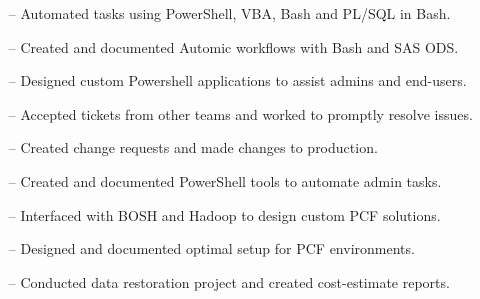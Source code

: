 \documentclass[10pt,a4paper]{altacv}
\begin{document}

\begin{itemize}
    \setlength{\itemindent}{0.5em}
    \item[--]   \small{Automated tasks using PowerShell, VBA, Bash and PL/SQL in Bash.}
    \item[--]   \small{Created and documented Automic workflows with Bash and SAS ODS.}
    \item[--]   \small{Designed custom Powershell applications to assist admins and end-users.}
\end{itemize}

\medskip



\begin{itemize}
    \setlength{\itemindent}{0.5em}
    \item[--]   \small{Accepted tickets from other teams and worked to promptly resolve issues.}
    \item[--]   \small{Created change requests and made changes to production.}
    \item[--]   \small{Created and documented PowerShell tools to automate admin tasks.}
\end{itemize}

\medskip



\begin{itemize}
    \setlength{\itemindent}{0.5em}
    \item[--]   \small{Interfaced with BOSH and Hadoop to design custom PCF solutions.}
    \item[--]   \small{Designed and documented optimal setup for PCF environments.}
    \item[--]   \small{Conducted data restoration project and created cost-estimate reports.}
\end{itemize}

\medskip


\end{document}
